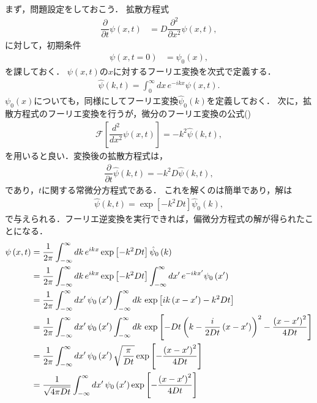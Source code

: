 まず，問題設定をしておこう．
拡散方程式
\begin{align}
 \dfrac{\partial}{\partial t}\psi\left(x,t\right) & =D\dfrac{\partial^{2}}{\partial x^{2}}\psi\left(x,t\right),
\end{align}
に対して，初期条件
\begin{align}
\psi\left(x,t=0\right) & = \psi_{0}(x), 
\end{align}
を課しておく．
$\psi(x,t)$の$x$に対するフーリエ変換を次式で定義する．
\begin{align}
  \hat{\psi}(k,t) = \int_{0}^{\infty}dx\,e^{-ikx}\psi(x,t).
\end{align}
$\psi_{0}(x)$についても，同様にしてフーリエ変換$\hat{\psi}_{0}(k)$を定義しておく．
次に，拡散方程式のフーリエ変換を行うが，微分のフーリエ変換の公式()
\begin{align}
 \mathcal{F}\left[\dfrac{d^2}{dx^2}\psi(x,t)\right] = -k^2 \hat{\psi}(k,t), 
\end{align}
を用いると良い．変換後の拡散方程式は，
\begin{align}
  \dfrac{\partial}{\partial t}\hat{\psi}(k,t) = -k^{2}D\hat{\psi}(k,t), 
\end{align}
であり，$t$に関する常微分方程式である．
これを解くのは簡単であり，解は
\begin{align}
 \hat{\psi}(k,t) = \exp\left[-k^2 D t\right]\hat{\psi}_{0}(k), 
\end{align}
で与えられる．フーリエ逆変換を実行できれば，偏微分方程式の解が得られたことになる．
\begin{align}
\psi\left(x,t\right) & =\dfrac{1}{2\pi}\int_{-\infty}^{\infty}dk\,e^{ikx}\exp\left[-k^{2}Dt\right]\hat{\psi}_{0}\left(k\right)\notag\\
 & =\dfrac{1}{2\pi}\int_{-\infty}^{\infty}dk\,e^{ikx}\exp\left[-k^{2}Dt\right]\int_{-\infty}^{\infty}dx^{\prime}\,e^{-ikx^{\prime}}\psi_{0}\left(x^{\prime}\right)\notag\\
 & =\dfrac{1}{2\pi}\int_{-\infty}^{\infty}dx^{\prime}\,\psi_{0}\left(x^{\prime}\right)\int_{-\infty}^{\infty}dk\,\exp\left[ik\left(x-x^{\prime}\right)-k^{2}Dt\right]\notag\\
 & =\dfrac{1}{2\pi}\int_{-\infty}^{\infty}dx^{\prime}\,\psi_{0}\left(x^{\prime}\right)\int_{-\infty}^{\infty}dk\,\exp\left[-Dt\left(k-\dfrac{i}{2Dt}\left(x-x^{\prime}\right)\right)^{2}-\dfrac{\left(x-x^{\prime}\right)^{2}}{4Dt}\right]\notag\\
 & =\dfrac{1}{2\pi}\int_{-\infty}^{\infty}dx^{\prime}\,\psi_{0}\left(x^{\prime}\right)\sqrt{\dfrac{\pi}{Dt}}\exp\left[-\dfrac{\left(x-x^{\prime}\right)^{2}}{4Dt}\right]\notag\\
 & =\dfrac{1}{\sqrt{4\pi Dt}}\int_{-\infty}^{\infty}dx^{\prime}\,\psi_{0}\left(x^{\prime}\right)\exp\left[-\dfrac{\left(x-x^{\prime}\right)^{2}}{4Dt}\right]
\end{align}

